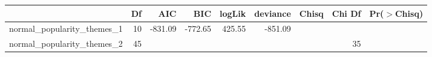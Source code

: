 \begin{table}[ht]
\centering
\begin{tabular}{lrrrrrrrr}
  \hline
 & Df & AIC & BIC & logLik & deviance & Chisq & Chi Df & Pr($>$Chisq) \\ 
  \hline
normal\_popularity\_themes\_1 & 10 & -831.09 & -772.65 & 425.55 & -851.09 &  &  &  \\ 
  normal\_popularity\_themes\_2 & 45 &  &  &  &  &  & 35 &  \\ 
   \hline
\end{tabular}
\end{table}
